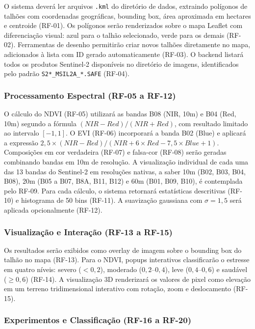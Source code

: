 \documentclass[12pt, a4paper]{article}
\begin{document}
O sistema deverá ler arquivos \texttt{.kml} do diretório de dados, extraindo polígonos de talhões com coordenadas geográficas, bounding box, área aproximada em hectares e centroide (RF-01). Os polígonos serão renderizados sobre o mapa Leaflet com diferenciação visual: azul para o talhão selecionado, verde para os demais (RF-02). Ferramentas de desenho permitirão criar novos talhões diretamente no mapa, adicionados à lista com ID gerado automaticamente (RF-03). O backend listará todos os produtos Sentinel-2 disponíveis no diretório de imagens, identificados pelo padrão \texttt{S2*\_MSIL2A\_*.SAFE} (RF-04).

\subsubsection{Processamento Espectral (RF-05 a RF-12)}

O cálculo do NDVI (RF-05) utilizará as bandas B08 (NIR, 10m) e B04 (Red, 10m) segundo a fórmula $(NIR - Red) / (NIR + Red)$, com resultado limitado ao intervalo $[-1, 1]$. O EVI (RF-06) incorporará a banda B02 (Blue) e aplicará a expressão $2{,}5 \times (NIR - Red) / (NIR + 6 \times Red - 7{,}5 \times Blue + 1)$. Composições em cor verdadeira (RF-07) e falsa-cor (RF-08) serão geradas combinando bandas em 10m de resolução. A visualização individual de cada uma das 13 bandas do Sentinel-2 em resoluções nativas, a saber 10m (B02, B03, B04, B08), 20m (B05 a B07, B8A, B11, B12) e 60m (B01, B09, B10), é contemplada pelo RF-09. Para cada cálculo, o sistema retornará estatísticas descritivas (RF-10) e histograma de 50 bins (RF-11). A suavização gaussiana com $\sigma = 1{,}5$ será aplicada opcionalmente (RF-12).

\subsubsection{Visualização e Interação (RF-13 a RF-15)}

Os resultados serão exibidos como overlay de imagem sobre o bounding box do talhão no mapa (RF-13). Para o NDVI, popups interativos classificarão o estresse em quatro níveis: severo ($< 0{,}2$), moderado ($0{,}2$--$0{,}4$), leve ($0{,}4$--$0{,}6$) e saudável ($\geq 0{,}6$) (RF-14). A visualização 3D renderizará os valores de pixel como elevação em um terreno tridimensional interativo com rotação, zoom e deslocamento (RF-15).

\subsubsection{Experimentos e Classificação (RF-16 a RF-20)}
\end{document}
